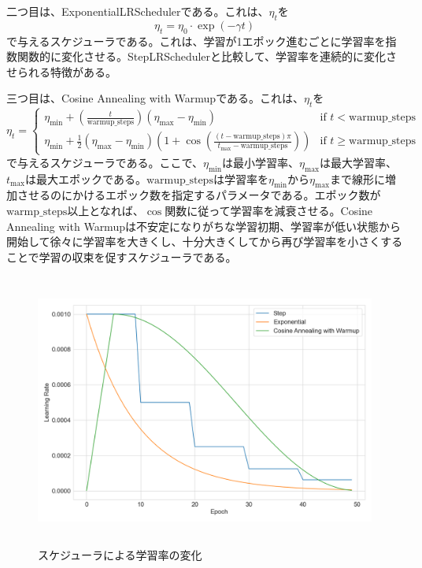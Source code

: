\documentclass[12pt]{jarticle}
\numberwithin{equation}{section}    %
\numberwithin{figure}{section}      %
\numberwithin{table}{section}      %
\begin{document}
二つ目は、ExponentialLRSchedulerである。これは、$\eta_{t}$を
\begin{equation}
    \eta_{t} = \eta_{0} \cdot \exp \left( -\gamma t \right)
\end{equation}
で与えるスケジューラである。これは、学習が1エポック進むごとに学習率を指数関数的に変化させる。StepLRSchedulerと比較して、学習率を連続的に変化させられる特徴がある。

三つ目は、Cosine Annealing with Warmupである。これは、$\eta_{t}$を
\begin{equation}
    \eta_{t} =
    \begin{cases}
        \eta_{\text{min}} + \left( \frac{t}{\text{warmup\_steps}} \right) (\eta_{\text{max}} - \eta_{\text{min}})                                                                                  & \text{if $t < \text{warmup\_steps}$}   \\
        \eta_{\text{min}} + \frac{1}{2} (\eta_{\text{max}} - \eta_{\text{min}}) \left( 1 + \cos \left( \frac{(t - \text{warmup\_steps})\pi}{t_{\text{max}} - \text{warmup\_steps}} \right) \right) & \text{if $t \ge \text{warmup\_steps}$}
    \end{cases}
\end{equation}
で与えるスケジューラである。ここで、$\eta_{\text{min}}$は最小学習率、$\eta_{\text{max}}$は最大学習率、$t_{\text{max}}$は最大エポックである。$\text{warmup\_steps}$は学習率を$\eta_{\text{min}}$から$\eta_{\text{max}}$まで線形に増加させるのにかけるエポック数を指定するパラメータである。エポック数が$\text{warmp\_steps}$以上となれば、$\cos$関数に従って学習率を減衰させる。Cosine Annealing with Warmupは不安定になりがちな学習初期、学習率が低い状態から開始して徐々に学習率を大きくし、十分大きくしてから再び学習率を小さくすることで学習の収束を促すスケジューラである。

\begin{figure}[bt]
    \centering
    \includegraphics[height=90mm]{./figure/sec3/lr_scheduler.png}
    \caption{スケジューラによる学習率の変化}
    \label{sec3:fig:lr_scheduler}
\end{figure}
\end{document}
